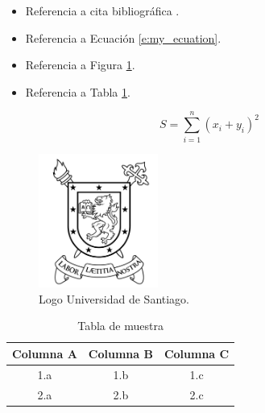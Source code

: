 
\begin{itemize}
    \item Referencia a cita bibliográfica  \cite{c:my_cite1} \cite{c:my_cite2}.
    \item Referencia a Ecuación \ref{e:my_ecuation}.
    \item Referencia a Figura \ref{f:my_figure}.
    \item Referencia a Tabla \ref{t:my_table}.
\end{itemize}

\begin{equation}
	\label{e:my_ecuation}
	S = \sum_{i=1}^n(x_{i}+y_{i})^2
\end{equation}

\begin{figure}[ht!]
    \begin{center}
        \includegraphics[width=0.35\textwidth]{img/logo_usach.pdf}
        \caption{Logo Universidad de Santiago.}
        \label{f:my_figure}
    \end{center}
\end{figure}

\begin{table}[!ht]
    \begin{center}
        \caption{Tabla de muestra}
        \label{t:my_table}
        \begin{tabular}{|c|c|c|}
            \hline
            Columna A & Columna B & Columna C \\ \hline \hline
            1.a & 1.b & 1.c \\ \hline
            2.a & 2.b & 2.c \\ \hline
        \end{tabular}
    \end{center}
\end{table}